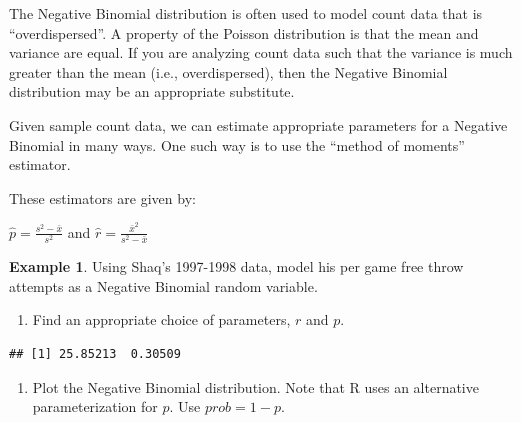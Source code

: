 \documentclass[
  11pt,
]{book}
\newenvironment{Shaded}{\begin{snugshade}}{\end{snugshade}}
\newcommand{\DecValTok}[1]{\textcolor[rgb]{0.00,0.00,0.81}{#1}}
\newcommand{\FunctionTok}[1]{\textcolor[rgb]{0.00,0.00,0.00}{#1}}
\newcommand{\NormalTok}[1]{#1}
\newcommand{\OtherTok}[1]{\textcolor[rgb]{0.56,0.35,0.01}{#1}}
\newcommand{\SpecialCharTok}[1]{\textcolor[rgb]{0.00,0.00,0.00}{#1}}
\providecommand{\tightlist}{%
  \setlength{\itemsep}{0pt}\setlength{\parskip}{0pt}}
\theoremstyle{definition}
\theoremstyle{definition}
\newtheorem{example}{Example}[chapter]
\theoremstyle{definition}
\theoremstyle{definition}
\theoremstyle{remark}
\begin{document}
The Negative Binomial distribution is often used to model count data that is ``overdispersed''. A property of the Poisson distribution is that the mean and variance are equal. If you are analyzing count data such that the variance is much greater than the mean (i.e., overdispersed), then the Negative Binomial distribution may be an appropriate substitute.

Given sample count data, we can estimate appropriate parameters for a Negative Binomial in many ways. One such way is to use the ``method of moments'' estimator.

These estimators are given by:

\(\hat{p} = \frac{s^2-\bar{x}}{s^2}\) and \(\hat{r} = \frac{\bar{x}^2}{s^2-\bar{x}}\)

\begin{example}
Using Shaq's 1997-1998 data, model his per game free throw attempts as a Negative Binomial random variable.
\end{example}

\begin{enumerate}
\def\labelenumi{(\alph{enumi})}
\tightlist
\item
  Find an appropriate choice of parameters, \(r\) and \(p\).
\end{enumerate}

\begin{Shaded}
\end{Shaded}

\begin{verbatim}
## [1] 25.85213  0.30509
\end{verbatim}

\begin{enumerate}
\def\labelenumi{(\alph{enumi})}
\setcounter{enumi}{1}
\tightlist
\item
  Plot the Negative Binomial distribution. Note that R uses an alternative parameterization for \(p\). Use \(prob = 1-p\).
\end{enumerate}
\end{document}
